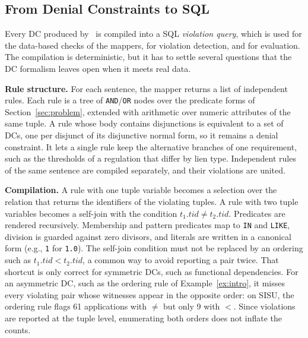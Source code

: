 \subsection{From Denial Constraints to SQL}
\label{sec:mapper:sql}

Every DC produced by \system\ is compiled into a SQL \emph{violation query}, which is used for the data-based checks of the mappers, for violation detection, and for evaluation. The compilation is deterministic, but it has to settle several questions that the DC formalism leaves open when it meets real data.

\smallskip\noindent\textbf{Rule structure.}
For each sentence, the mapper returns a list of independent rules. Each rule is a tree of \texttt{AND}/\texttt{OR} nodes over the predicate forms of Section~\ref{sec:problem}, extended with arithmetic over numeric attributes of the same tuple. A rule whose body contains disjunctions is equivalent to a set of DCs, one per disjunct of its disjunctive normal form, so it remains a denial constraint. It lets a single rule keep the alternative branches of one requirement, such as the thresholds of a regulation that differ by lien type. Independent rules of the same sentence are compiled separately, and their violations are united.

\smallskip\noindent\textbf{Compilation.}
A rule with one tuple variable becomes a selection over the relation that returns the identifiers of the violating tuples. A rule with two tuple variables becomes a self-join with the condition $t_1.\mathit{tid} \neq t_2.\mathit{tid}$. Predicates are rendered recursively. Membership and pattern predicates map to \texttt{IN} and \texttt{LIKE}, division is guarded against zero divisors, and literals are written in a canonical form (e.g., \texttt{1} for \texttt{1.0}). The self-join condition must not be replaced by an ordering such as $t_1.\mathit{tid} < t_2.\mathit{tid}$, a common way to avoid reporting a pair twice. That shortcut is only correct for symmetric DCs, such as functional dependencies. For an asymmetric DC, such as the ordering rule of Example~\ref{ex:intro}, it misses every violating pair whose witnesses appear in the opposite order: on SISU, the ordering rule flags 61 applications with $\neq$ but only 9 with $<$. Since violations are reported at the tuple level, enumerating both orders does not inflate the counts.

